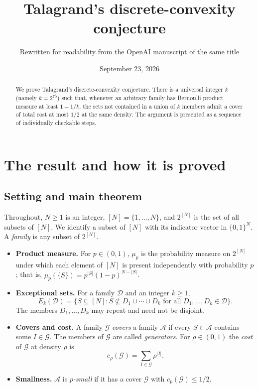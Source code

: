 \documentclass[11pt,letterpaper]{article}
\title{Talagrand's discrete-convexity conjecture}
\author{Rewritten for readability from the OpenAI manuscript of the same title}
\date{September 23, 2026}
\theoremstyle{definition}
\theoremstyle{remark}
\numberwithin{equation}{section}
\begin{document}
\maketitle
\begin{abstract}
We prove Talagrand's discrete-convexity conjecture.
There is a universal integer $k$ (namely $k=2^{75}$) such that, whenever an
arbitrary family has Bernoulli product measure at least $1-1/k$, the sets not
contained in a union of $k$ members admit a cover of total cost at most $1/2$
at the same density.
The argument is presented as a sequence of individually checkable steps.
\end{abstract}

\section{The result and how it is proved}
\label{sec:introduction}

\subsection{Setting and main theorem}

Throughout, $N\ge1$ is an integer, $[N]=\{1,\ldots,N\}$, and $2^{[N]}$ is the
set of all subsets of $[N]$. We identify a subset of $[N]$ with its indicator
vector in $\{0,1\}^N$. A \emph{family} is any subset of $2^{[N]}$.

\begin{itemize}
\item \textbf{Product measure.} For $p\in(0,1)$, $\mu_p$ is the probability
measure on $2^{[N]}$ under which each element of $[N]$ is present independently
with probability $p$; that is, $\mu_p(\{S\})=p^{|S|}(1-p)^{N-|S|}$.
\item \textbf{Exceptional sets.} For a family $\mathcal D$ and an integer
$k\ge1$,
\begin{equation}
\label{eq:exceptional-definition}
E_k(\mathcal D)
=\bigl\{S\subseteq[N]:
  S\nsubseteq D_1\cup\cdots\cup D_k
  \text{ for all }D_1,\ldots,D_k\in\mathcal D\bigr\}.
\end{equation}
The members $D_1,\ldots,D_k$ may repeat and need not be disjoint.
\item \textbf{Covers and cost.} A family $\mathcal G$ \emph{covers} a family
$\mathcal A$ if every $S\in\mathcal A$ contains some $I\in\mathcal G$. The
members of $\mathcal G$ are called \emph{generators}. For $\rho\in(0,1)$ the
\emph{cost} of $\mathcal G$ at density $\rho$ is
\[
c_\rho(\mathcal G)=\sum_{I\in\mathcal G}\rho^{|I|}.
\]
\item \textbf{Smallness.} $\mathcal A$ is \emph{$p$-small} if it has a cover
$\mathcal G$ with $c_p(\mathcal G)\le1/2$.
\end{itemize}
\end{document}
